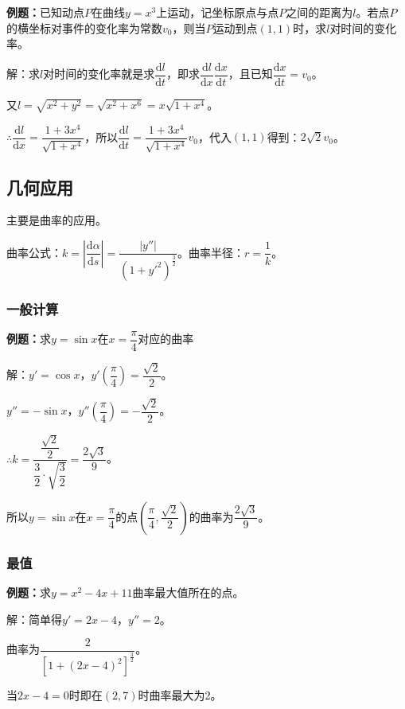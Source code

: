 \documentclass[UTF8, 12pt]{ctexart}
\begin{document}
\textbf{例题：}已知动点$P$在曲线$y=x^3$上运动，记坐标原点与点$P$之间的距离为$l$。若点$P$的横坐标对事件的变化率为常数$v_0$，则当$P$运动到点$(1,1)$时，求$l$对时间的变化率。

解：求$l$对时间的变化率就是求$\dfrac{\textrm{d}l}{\textrm{d}t}$，即求$\dfrac{\textrm{d}l}{\textrm{d}x}\dfrac{\textrm{d}x}{\textrm{d}t}$，且已知$\dfrac{\textrm{d}x}{\textrm{d}t}=v_0$。

又$l=\sqrt{x^2+y^2}=\sqrt{x^2+x^6}=x\sqrt{1+x^4}$。

$\therefore\dfrac{\textrm{d}l}{\textrm{d}x}=\dfrac{1+3x^4}{\sqrt{1+x^4}}$，所以$\dfrac{\textrm{d}l}{\textrm{d}t}=\dfrac{1+3x^4}{\sqrt{1+x^4}}v_0$，代入$(1,1)$得到：$2\sqrt{2}v_0$。

\subsection{几何应用}

主要是曲率的应用。

曲率公式：$k=\left\lvert\dfrac{\textrm{d}\alpha}{\textrm{d}s}\right\rvert=\dfrac{\vert y''\vert}{(1+y'^2)^{\frac{3}{2}}}$。曲率半径：$r=\dfrac{1}{k}$。

\subsubsection{一般计算}

\textbf{例题：}求$y=\sin x$在$x=\dfrac{\pi}{4}$对应的曲率

解：$y'=\cos x$，$y'(\dfrac{\pi}{4})=\dfrac{\sqrt{2}}{2}$。

$y''=-\sin x$，$y''(\dfrac{\pi}{4})=-\dfrac{\sqrt{2}}{2}$。

$\therefore k=\dfrac{\dfrac{\sqrt{2}}{2}}{\dfrac{3}{2}\cdot\sqrt{\dfrac{3}{2}}}=\dfrac{2\sqrt{3}}{9}$。

所以$y=\sin x$在$x=\dfrac{\pi}{4}$的点$(\dfrac{\pi}{4},\dfrac{\sqrt{2}}{2})$的曲率为$\dfrac{2\sqrt{3}}{9}$。

\subsubsection{最值}

\textbf{例题：}求$y=x^2-4x+11$曲率最大值所在的点。

解：简单得$y'=2x-4$，$y''=2$。

曲率为$\dfrac{2}{[1+(2x-4)^2]^{\frac{3}{2}}}$。

当$2x-4=0$时即在$(2,7)$时曲率最大为2。
\end{document}
